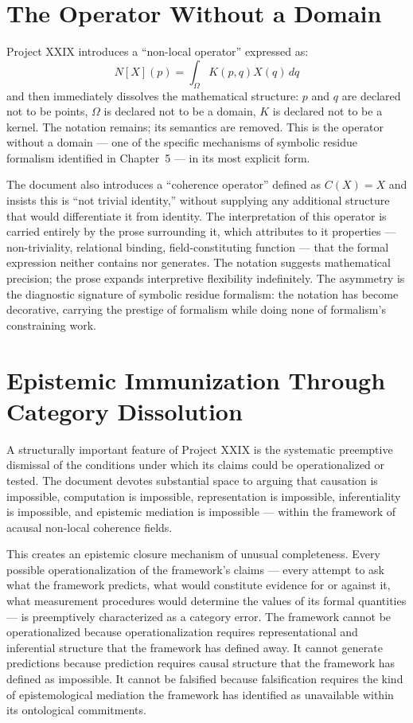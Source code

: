 \documentclass[12pt, openright, twoside]{book}
\begin{document}
\section{The Operator Without a Domain}

Project XXIX introduces a ``non-local operator'' expressed as:
\begin{equation}
N[X](p) = \int_\Omega K(p,q) X(q)\, dq
\end{equation}
and then immediately dissolves the mathematical structure: $p$ and $q$ are
declared not to be points, $\Omega$ is declared not to be a domain, $K$ is
declared not to be a kernel. The notation remains; its semantics are removed.
This is the operator without a domain --- one of the specific mechanisms of
symbolic residue formalism identified in Chapter~5 --- in its most explicit
form.

The document also introduces a ``coherence operator'' defined as $C(X) = X$
and insists this is ``not trivial identity,'' without supplying any additional
structure that would differentiate it from identity. The interpretation of this
operator is carried entirely by the prose surrounding it, which attributes to
it properties --- non-triviality, relational binding, field-constituting function
--- that the formal expression neither contains nor generates. The notation
suggests mathematical precision; the prose expands interpretive flexibility
indefinitely. The asymmetry is the diagnostic signature of symbolic residue
formalism: the notation has become decorative, carrying the prestige of
formalism while doing none of formalism's constraining work.

\section{Epistemic Immunization Through Category Dissolution}

A structurally important feature of Project XXIX is the systematic preemptive
dismissal of the conditions under which its claims could be operationalized
or tested. The document devotes substantial space to arguing that causation
is impossible, computation is impossible, representation is impossible,
inferentiality is impossible, and epistemic mediation is impossible --- within
the framework of acausal non-local coherence fields.

This creates an epistemic closure mechanism of unusual completeness. Every
possible operationalization of the framework's claims --- every attempt to
ask what the framework predicts, what would constitute evidence for or against
it, what measurement procedures would determine the values of its formal
quantities --- is preemptively characterized as a category error. The framework
cannot be operationalized because operationalization requires representational
and inferential structure that the framework has defined away. It cannot generate
predictions because prediction requires causal structure that the framework
has defined as impossible. It cannot be falsified because falsification requires
the kind of epistemological mediation the framework has identified as unavailable
within its ontological commitments.
\end{document}
